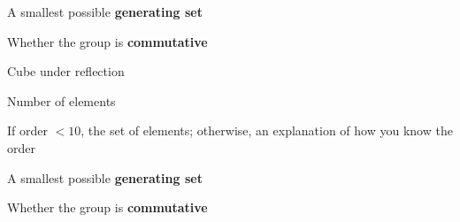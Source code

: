 \documentclass[../gatm_answers.tex]{subfiles}
\begin{document}
\begin{inner_problem}
\item A smallest possible \textbf{generating set}
\end{inner_problem}

\begin{inner_problem}
\item Whether the group is \textbf{commutative}
\end{inner_problem}

\begin{outer_problem}
\item Cube under reflection
\end{outer_problem}

\begin{inner_problem}[start=1]
\item Number of elements
\end{inner_problem}

\begin{inner_problem}
\item If order $< 10$, the set of elements; otherwise, an explanation of how you know the order
\end{inner_problem}

\begin{inner_problem}
\item A smallest possible \textbf{generating set}
\end{inner_problem}

\begin{inner_problem}
\item Whether the group is \textbf{commutative}
\end{inner_problem}
\end{document}
